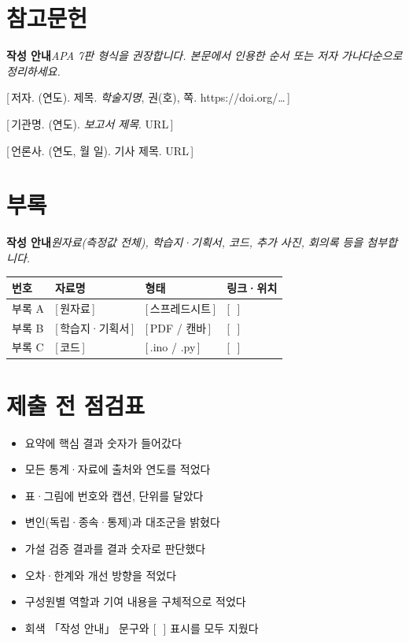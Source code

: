 \documentclass[11pt,a4paper]{article}
\newcommand{\guide}[1]{\par{\small\color{leaf}\sffamily\bfseries 작성 안내\quad}{\small\color{mute}\itshape #1}\par\smallskip}
\newcommand{\ph}[1]{{\color{ph}[\,#1\,]}}
\newcommand{\tcell}[1]{\sffamily\bfseries\color{forest}#1}
\begin{document}
\section*{참고문헌}
\guide{APA 7판 형식을 권장합니다. 본문에서 인용한 순서 또는 저자 가나다순으로 정리하세요.}
\begin{enumerate}[label={[\arabic*]}]
  \item \ph{저자. (연도). 제목. \textit{학술지명}, 권(호), 쪽. https://doi.org/…}
  \item \ph{기관명. (연도). \textit{보고서 제목}. URL}
  \item \ph{언론사. (연도, 월 일). 기사 제목. URL}
\end{enumerate}

\section*{부록}
\guide{원자료(측정값 전체), 학습지·기획서, 코드, 추가 사진, 회의록 등을 첨부합니다.}
\begin{tabularx}{\linewidth}{p{18mm} X p{30mm} X}
\toprule
\rowcolor{head}\tcell{번호} & \tcell{자료명} & \tcell{형태} & \tcell{링크·위치} \\
\midrule
부록 A & \ph{원자료} & \ph{스프레드시트} & \ph{ } \\
부록 B & \ph{학습지·기획서} & \ph{PDF / 캔바} & \ph{ } \\
부록 C & \ph{코드} & \ph{.ino / .py} & \ph{ } \\
\bottomrule
\end{tabularx}

\section*{제출 전 점검표}
\begin{itemize}[label={\color{forest}$\square$}]
  \item 요약에 핵심 결과 숫자가 들어갔다
  \item 모든 통계·자료에 출처와 연도를 적었다
  \item 표·그림에 번호와 캡션, 단위를 달았다
  \item 변인(독립·종속·통제)과 대조군을 밝혔다
  \item 가설 검증 결과를 결과 숫자로 판단했다
  \item 오차·한계와 개선 방향을 적었다
  \item 구성원별 역할과 기여 내용을 구체적으로 적었다
  \item 회색 「작성 안내」 문구와 \ph{ } 표시를 모두 지웠다
\end{itemize}
\end{document}
